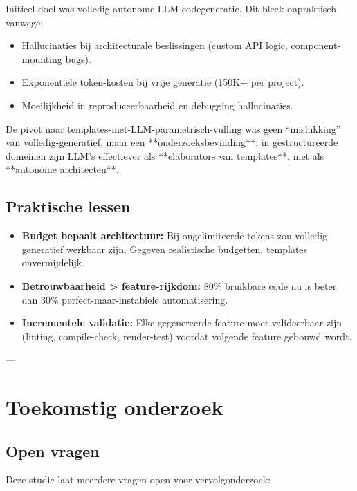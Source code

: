 Initieel doel was volledig autonome LLM-codegeneratie. Dit bleek onpraktisch vanwege:
\begin{itemize}
  \item Hallucinaties bij architecturale beslissingen (custom API logic, component-mounting bugs).
  \item Exponentiële token-kosten bij vrije generatie (150K+ per project).
  \item Moeilijkheid in reproduceerbaarheid en debugging hallucinaties.
\end{itemize}

De pivot naar templates-met-LLM-parametrisch-vulling was geen ``mislukking'' van volledig-generatief, maar een **onderzoeksbevinding**: in gestructureerde domeinen zijn LLM's effectiever als **elaborators van templates**, niet als **autonome architecten**.

\subsection{Praktische lessen}

\begin{itemize}
  \item \textbf{Budget bepaalt architectuur:} Bij ongelimiteerde tokens zou volledig-generatief werkbaar zijn. Gegeven realistische budgetten, templates onvermijdelijk.
  
  \item \textbf{Betrouwbaarheid > feature-rijkdom:} 80\% bruikbare code nu is beter dan 30\% perfect-maar-instabiele automatisering.
  
  \item \textbf{Incrementele validatie:} Elke gegenereerde feature moet valideerbaar zijn (linting, compile-check, render-test) voordat volgende feature gebouwd wordt.
\end{itemize}

---

\section{Toekomstig onderzoek}

\subsection{Open vragen}

Deze studie laat meerdere vragen open voor vervolgonderzoek:

